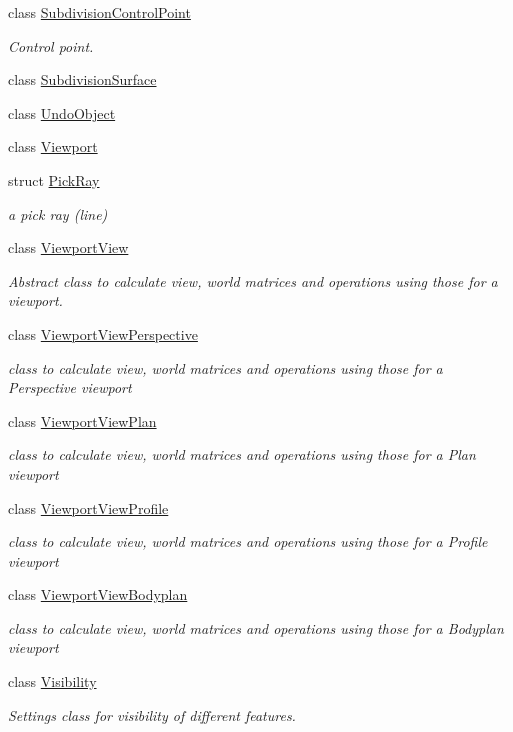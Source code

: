 \begin{DoxyCompactItemize}
class \hyperlink{classShipCAD_1_1SubdivisionControlPoint}{Subdivision\-Control\-Point}
\begin{DoxyCompactList}\small\item\em Control point. \end{DoxyCompactList}\item 
class \hyperlink{classShipCAD_1_1SubdivisionSurface}{Subdivision\-Surface}
\item 
class \hyperlink{classShipCAD_1_1UndoObject}{Undo\-Object}
\item 
class \hyperlink{classShipCAD_1_1Viewport}{Viewport}
\item 
struct \hyperlink{structShipCAD_1_1PickRay}{Pick\-Ray}
\begin{DoxyCompactList}\small\item\em a pick ray (line) \end{DoxyCompactList}\item 
class \hyperlink{classShipCAD_1_1ViewportView}{Viewport\-View}
\begin{DoxyCompactList}\small\item\em Abstract class to calculate view, world matrices and operations using those for a viewport. \end{DoxyCompactList}\item 
class \hyperlink{classShipCAD_1_1ViewportViewPerspective}{Viewport\-View\-Perspective}
\begin{DoxyCompactList}\small\item\em class to calculate view, world matrices and operations using those for a Perspective viewport \end{DoxyCompactList}\item 
class \hyperlink{classShipCAD_1_1ViewportViewPlan}{Viewport\-View\-Plan}
\begin{DoxyCompactList}\small\item\em class to calculate view, world matrices and operations using those for a Plan viewport \end{DoxyCompactList}\item 
class \hyperlink{classShipCAD_1_1ViewportViewProfile}{Viewport\-View\-Profile}
\begin{DoxyCompactList}\small\item\em class to calculate view, world matrices and operations using those for a Profile viewport \end{DoxyCompactList}\item 
class \hyperlink{classShipCAD_1_1ViewportViewBodyplan}{Viewport\-View\-Bodyplan}
\begin{DoxyCompactList}\small\item\em class to calculate view, world matrices and operations using those for a Bodyplan viewport \end{DoxyCompactList}\item 
class \hyperlink{classShipCAD_1_1Visibility}{Visibility}
\begin{DoxyCompactList}\small\item\em Settings class for visibility of different features. \end{DoxyCompactList}\end{DoxyCompactItemize}
